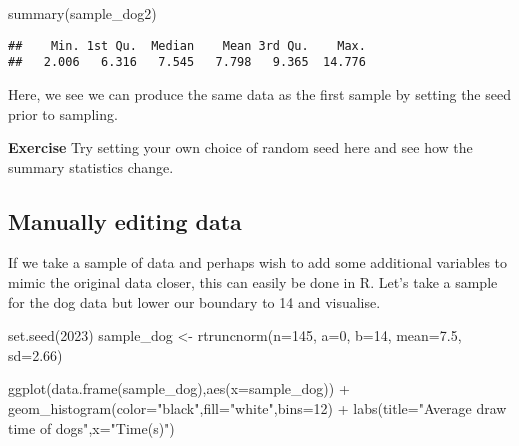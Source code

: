 \documentclass[
]{book}
\newenvironment{Shaded}{\begin{snugshade}}{\end{snugshade}}
\newcommand{\AttributeTok}[1]{\textcolor[rgb]{0.77,0.63,0.00}{#1}}
\newcommand{\DecValTok}[1]{\textcolor[rgb]{0.00,0.00,0.81}{#1}}
\newcommand{\FloatTok}[1]{\textcolor[rgb]{0.00,0.00,0.81}{#1}}
\newcommand{\FunctionTok}[1]{\textcolor[rgb]{0.00,0.00,0.00}{#1}}
\newcommand{\NormalTok}[1]{#1}
\newcommand{\OtherTok}[1]{\textcolor[rgb]{0.56,0.35,0.01}{#1}}
\newcommand{\SpecialCharTok}[1]{\textcolor[rgb]{0.00,0.00,0.00}{#1}}
\newcommand{\StringTok}[1]{\textcolor[rgb]{0.31,0.60,0.02}{#1}}
\begin{document}
\begin{Shaded}
\begin{Highlighting}[]
\FunctionTok{summary}\NormalTok{(sample\_dog2)}
\end{Highlighting}
\end{Shaded}

\begin{verbatim}
##    Min. 1st Qu.  Median    Mean 3rd Qu.    Max. 
##   2.006   6.316   7.545   7.798   9.365  14.776
\end{verbatim}

Here, we see we can produce the same data as the first sample by setting the seed prior to sampling.

\textbf{Exercise}
Try setting your own choice of random seed here and see how the summary statistics change.

\hypertarget{manually-editing-data}{%
\subsection{Manually editing data}\label{manually-editing-data}}

If we take a sample of data and perhaps wish to add some additional variables to mimic the original data closer, this can easily be done in R. Let's take a sample for the dog data but lower our boundary to 14 and visualise.

\begin{Shaded}
\begin{Highlighting}[]
\FunctionTok{set.seed}\NormalTok{(}\DecValTok{2023}\NormalTok{)}
\NormalTok{sample\_dog }\OtherTok{\textless{}{-}} \FunctionTok{rtruncnorm}\NormalTok{(}\AttributeTok{n=}\DecValTok{145}\NormalTok{, }\AttributeTok{a=}\DecValTok{0}\NormalTok{, }\AttributeTok{b=}\DecValTok{14}\NormalTok{, }\AttributeTok{mean=}\FloatTok{7.5}\NormalTok{, }\AttributeTok{sd=}\FloatTok{2.66}\NormalTok{)}

\FunctionTok{ggplot}\NormalTok{(}\FunctionTok{data.frame}\NormalTok{(sample\_dog),}\FunctionTok{aes}\NormalTok{(}\AttributeTok{x=}\NormalTok{sample\_dog)) }\SpecialCharTok{+}
  \FunctionTok{geom\_histogram}\NormalTok{(}\AttributeTok{color=}\StringTok{"black"}\NormalTok{,}\AttributeTok{fill=}\StringTok{"white"}\NormalTok{,}\AttributeTok{bins=}\DecValTok{12}\NormalTok{) }\SpecialCharTok{+} 
            \FunctionTok{labs}\NormalTok{(}\AttributeTok{title=}\StringTok{"Average draw time of dogs"}\NormalTok{,}\AttributeTok{x=}\StringTok{"Time(s)"}\NormalTok{)}
\end{Highlighting}
\end{Shaded}
\end{document}

